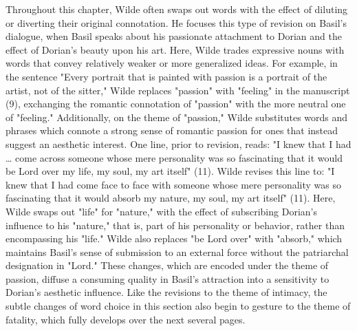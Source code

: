 \documentclass[11pt]{article}
\begin{document}
Throughout this chapter, Wilde often swaps out words with the effect
of diluting or diverting their original connotation. He focuses this
type of revision on Basil's dialogue, when Basil speaks about his
passionate attachment to Dorian and the effect of Dorian's beauty upon
his art.  Here, Wilde trades expressive nouns with words that convey
relatively weaker or more generalized ideas. For example, in the
sentence "Every portrait that is painted with passion is a portrait of
the artist, not of the sitter," Wilde replaces "passion" with
"feeling" in the manuscript (9), exchanging the romantic connotation
of "passion" with the more neutral one of "feeling." Additionally, on
the theme of "passion," Wilde substitutes words and phrases which
connote a strong sense of romantic passion for ones that instead
suggest an aesthetic interest. One line, prior to revision, reads: "I
knew that I had \ldots{}  come across someone whose mere personality was so
fascinating that it would be Lord over my life, my soul, my art
itself" (11). Wilde revises this line to: "I knew that I had come face
to face with someone whose mere personality was so fascinating that it
would absorb my nature, my soul, my art itself" (11). Here, Wilde
swaps out "life" for "nature," with the effect of subscribing Dorian's
influence to his "nature," that is, part of his personality or
behavior, rather than encompassing his "life." Wilde also replaces "be
Lord over" with "absorb," which maintains Basil's sense of submission
to an external force without the patriarchal designation in "Lord."
These changes, which are encoded under the theme of passion, diffuse a
consuming quality in Basil's attraction into a sensitivity to Dorian's
aesthetic influence. Like the revisions to the theme of intimacy, the
subtle changes of word choice in this section also begin to gesture to
the theme of fatality, which fully develops over the next several
pages.
\end{document}
